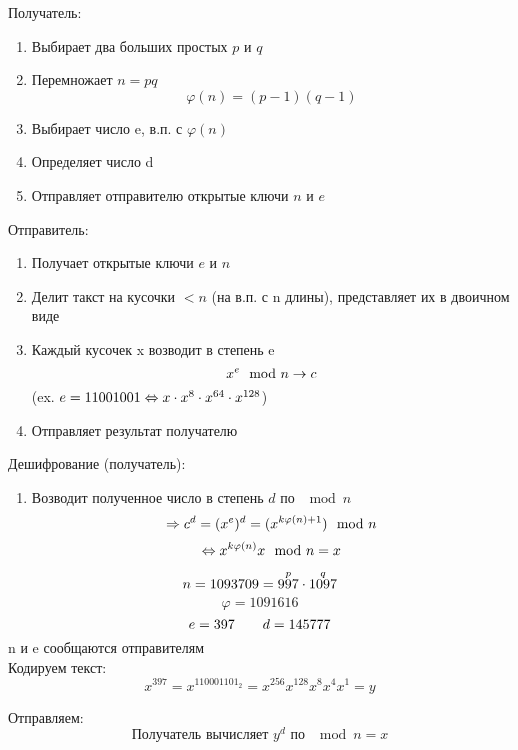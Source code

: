 \documentclass[discrete.tex]{subfiles}
\begin{document}
  \begin{alg}[RSA]
    Получатель:
    \begin{enumerate}
      \item Выбирает два больших простых $p$ и $q$
      \item Перемножает $n=pq$
      \[\varphi(n) = (p-1)(q-1)\]
      \item Выбирает число e, в.п. с $\varphi(n)$
      \item Определяет число d
      \item Отправляет отправителю открытые ключи $n$ и $e$
    \end{enumerate}
    Отправитель:
    \begin{enumerate}
      \item Получает открытые ключи $e$ и $n$
      \item Делит такст на кусочки $<n$ (на в.п. с n длины), представляет их в двоичном виде
      \item Каждый кусочек x возводит в степень e
      \[x^e \mod n \rightarrow c\]
      (ex. $e=11001001 \Leftrightarrow x \cdot x^8 \cdot x^{64} \cdot x^{128}$)
      \item Отправляет результат получателю
    \end{enumerate}
    Дешифрование (получатель):
    \begin{enumerate}
      \item Возводит полученное число в степень $d$ по $\mod n$
      \[\Rightarrow c^d = (x^e)^d = (x^{k \varphi(n) + 1}) \mod n\]
      \[\Leftrightarrow x^{k \varphi(n)} x \mod n = x\]
    \end{enumerate}
  \end{alg}

  \begin{Example}
    \[n=1093709 = \overset{p}{997} \cdot \overset{q}{1097}\]
    \[\varphi = 1091616\]
    \[e = 397 \qquad d = 145777\]
    n и e сообщаются отправителям\\

    Кодируем текст:
    \[x^397 = x^{110001101_2} = x^{256} x^{128} x^{8} x^{4} x^1 = y\]

    Отправляем:
    \[\text{Получатель вычисляет $y^d$ по $\mod n = x$}\]
  \end{Example}
\end{document}
